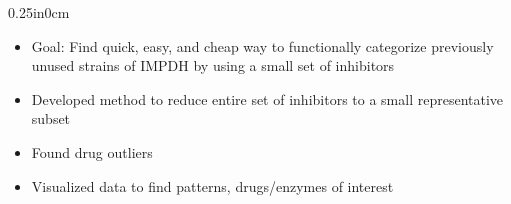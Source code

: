 \documentclass[11pt]{article}
\newcommand{\blockindent}{0.25in}
\begin{document}
\begin{adjustwidth}{\blockindent}{0cm}
\begin{itemize}
\begin{itemize}
		\vspace{-3pt}
		\item Goal: Find quick, easy, and cheap way to functionally categorize previously unused strains of IMPDH by using a small set of inhibitors

		\item Developed method to reduce entire set of inhibitors to a small representative subset

		\item Found drug outliers

		\item Visualized data to find patterns, drugs/enzymes of interest

	\end{itemize}

\end{itemize}

\end{adjustwidth}

\end{document}
